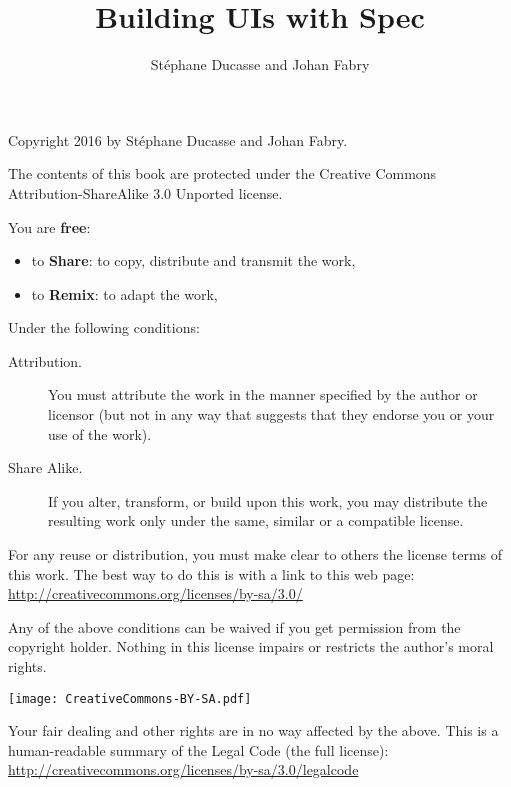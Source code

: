 \documentclass[10pt,twoside,english]{support/latex/sbabook/sbabook}
\title{Building UIs with Spec}
\author{St\'ephane Ducasse and Johan Fabry}
\begin{document}
\maketitle
\pagestyle{titlingpage}
\thispagestyle{titlingpage} %

\cleartoverso
{\small

  Copyright 2016 by Stéphane Ducasse and Johan Fabry.

  The contents of this book are protected under the Creative Commons
  Attribution-ShareAlike 3.0 Unported license.

  You are \textbf{free}:
  \begin{itemize}
  \item to \textbf{Share}: to copy, distribute and transmit the work,
  \item to \textbf{Remix}: to adapt the work,
  \end{itemize}

  Under the following conditions:
  \begin{description}
  \item[Attribution.] You must attribute the work in the manner specified by the
    author or licensor (but not in any way that suggests that they endorse you
    or your use of the work).
  \item[Share Alike.] If you alter, transform, or build upon this work, you may
    distribute the resulting work only under the same, similar or a compatible
    license.
  \end{description}

  For any reuse or distribution, you must make clear to others the
  license terms of this work. The best way to do this is with a link to
  this web page: \\
  \url{http://creativecommons.org/licenses/by-sa/3.0/}

  Any of the above conditions can be waived if you get permission from
  the copyright holder. Nothing in this license impairs or restricts the
  author's moral rights.

  \begin{center}
    \texttt{[image: CreativeCommons-BY-SA.pdf]}
  \end{center}

  Your fair dealing and other rights are in no way affected by the
  above. This is a human-readable summary of the Legal Code (the full
  license): \\
  \url{http://creativecommons.org/licenses/by-sa/3.0/legalcode}

}
\end{document}
